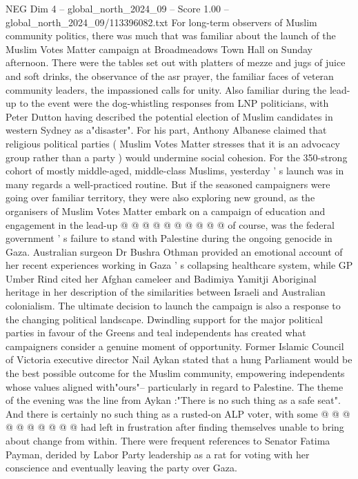 \begin{textsample}{NEG Dim 4 – global\_north\_2024\_09 – Score 1.00 – global\_north\_2024\_09/113396082.txt}  \label{ex:f4_neg_145}
For long-term observers of Muslim community politics, there was much that was familiar about the launch of the Muslim Votes Matter campaign at Broadmeadows Town Hall on Sunday afternoon.
There were the tables set out with platters of mezze and jugs of juice and soft drinks, the observance of the asr prayer, the familiar faces of veteran community leaders, the impassioned calls for unity.
Also familiar during the lead-up to the event were the dog-whistling responses from LNP politicians, with Peter Dutton having described the potential election of Muslim candidates in western Sydney as a"disaster".
For his part, Anthony Albanese claimed that religious political parties ( Muslim Votes Matter stresses that it is an advocacy group rather than a party ) would undermine social cohesion.
For the 350-strong cohort of mostly middle-aged, middle-class Muslims, yesterday ' s launch was in many regards a well-practiced routine.
But if the seasoned campaigners were going over familiar territory, they were also exploring new ground, as the organisers of Muslim Votes Matter embark on a campaign of education and engagement in the lead-up @ @ @ @ @ @ @ @ @ @ of course, was the federal government ' s failure to stand with Palestine during the ongoing genocide in Gaza.
Australian surgeon Dr Bushra Othman provided an emotional account of her recent experiences working in Gaza ' s collapsing healthcare system, while GP Umber Rind cited her Afghan cameleer and Badimiya Yamitji Aboriginal heritage in her description of the similarities between Israeli and Australian colonialism.
The ultimate decision to launch the campaign is also a response to the changing political landscape.
Dwindling support for the major political parties in favour of the Greens and teal independents has created what campaigners consider a genuine moment of opportunity.
Former Islamic Council of Victoria executive director Nail Aykan stated that a hung Parliament would be the best possible outcome for the Muslim community, empowering independents whose values aligned with"ours"-- particularly in regard to Palestine.
The theme of the evening was the line from Aykan :"There is no such thing as a safe seat".
And there is certainly no such thing as a rusted-on ALP voter, with some @ @ @ @ @ @ @ @ @ @ had left in frustration after finding themselves unable to bring about change from within.
There were frequent references to Senator Fatima Payman, derided by Labor Party leadership as a rat for voting with her conscience and eventually leaving the party over Gaza.

\end{textsample}
